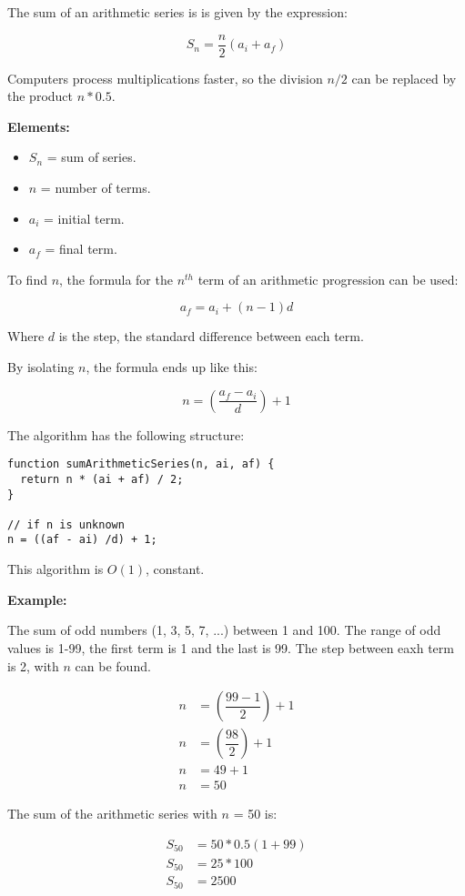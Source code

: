 The sum of an arithmetic series is is given by the expression:

\[\boxed{
  S_n = \dfrac{n}{2}\left(a_i+a_f\right)
}\]

Computers process multiplications faster, so the division $n/2$ can be replaced by the product $n*0.5$.

\textbf{Elements:}

\begin{itemize}
  \item $S_n$ = sum of series.
  \item $n$ = number of terms.
  \item $a_i$ = initial term.
  \item $a_f$ = final term.
\end{itemize}

To find $n$, the formula for the $n^{th}$ term of an arithmetic progression can be used:

\[\boxed{
  a_f = a_i + (n-1)d
}\]

Where $d$ is the step, the standard difference between each term.

By isolating $n$, the formula ends up like this:

\[\boxed{
  n = \left(\dfrac{a_f-a_i}{d}\right)+1
}\]

The algorithm has the following structure:

\begin{lstlisting}[style=general]
function sumArithmeticSeries(n, ai, af) {
  return n * (ai + af) / 2;
}

// if n is unknown
n = ((af - ai) /d) + 1;
\end{lstlisting}

This algorithm is $O(1)$, constant.

\textbf{Example:}

The sum of odd numbers (1, 3, 5, 7, ...) between 1 and 100. The range of odd values is 1-99, the first term is 1 and the last is 99. The step between eaxh term is 2, with $n$ can be found.

\begin{align*}
  n &= \left(\dfrac{99-1}{2}\right)+1 \\
  n &= \left(\dfrac{98}{2}\right)+1 \\
  n &= 49+1 \\
  n &= 50
\end{align*}

The sum of the arithmetic series with $n$ = 50 is:

\begin{align*}
  S_{50} &= 50*0.5\left(1+99\right) \\
  S_{50} &= 25*100 \\
  S_{50} &= 2500
\end{align*}
